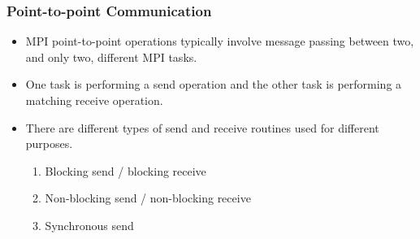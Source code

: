 \documentclass[10pt,t]{beamer}
\begin{document}
\begin{frame}[fragile]
  \frametitle{Point-to-point Communication}
  \begin{itemize}
  \item MPI point-to-point operations typically involve message passing between two, and only two, different MPI tasks. 
  \item One task is performing a send operation and the other task is performing a matching receive operation.
  \item There are different types of send and receive routines used for different purposes.
    \begin{enumerate}
    \item Blocking send / blocking receive
    \item Non-blocking send / non-blocking receive
    \item Synchronous send
    \end{enumerate}
  \end{itemize}
\end{frame}
\end{document}
